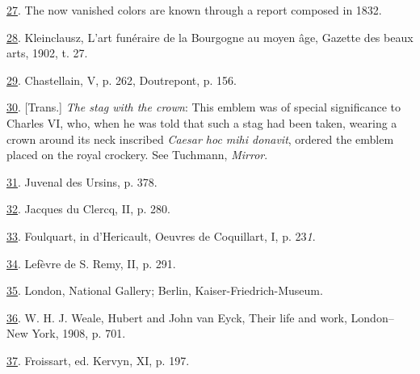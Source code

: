 \protect\hypertarget{23_NOTES.xhtmlux5cux23id_420}{\protect\hyperlink{20_ILLUSTRATIONS_FOLLOW_PAGE.xhtmlux5cux23id_419}{27}}.
The now vanished colors are known through a report composed in 1832.

\protect\hypertarget{23_NOTES.xhtmlux5cux23id_418}{\protect\hyperlink{20_ILLUSTRATIONS_FOLLOW_PAGE.xhtmlux5cux23id_417}{28}}.
Kleinclausz, L'art funéraire de la Bourgogne au moyen âge, Gazette des
beaux arts, 1902, t. 27.

\protect\hypertarget{23_NOTES.xhtmlux5cux23id_416}{\protect\hyperlink{20_ILLUSTRATIONS_FOLLOW_PAGE.xhtmlux5cux23id_415}{29}}.
Chastellain, V, p. 262, Doutrepont, p. 156.

\protect\hypertarget{23_NOTES.xhtmlux5cux23id_414}{\protect\hyperlink{20_ILLUSTRATIONS_FOLLOW_PAGE.xhtmlux5cux23id_413}{30}}.
{[}Trans.{]} \emph{The stag with the crown}: This emblem was of special
significance to Charles VI, who, when he was told that such a stag had
been taken, wearing
\protect\hypertarget{23_NOTES.xhtmlux5cux23page_433}{}{}a crown around
its neck inscribed \emph{Caesar hoc mihi donavit}, ordered the emblem
placed on the royal crockery. See Tuchmann, \emph{Mirror}.

\protect\hypertarget{23_NOTES.xhtmlux5cux23id_412}{\protect\hyperlink{20_ILLUSTRATIONS_FOLLOW_PAGE.xhtmlux5cux23id_411}{31}}.
Juvenal des Ursins, p. 378.

\protect\hypertarget{23_NOTES.xhtmlux5cux23id_410}{\protect\hyperlink{20_ILLUSTRATIONS_FOLLOW_PAGE.xhtmlux5cux23id_409}{32}}.
Jacques du Clercq, II, p. 280.

\protect\hypertarget{23_NOTES.xhtmlux5cux23id_408}{\protect\hyperlink{20_ILLUSTRATIONS_FOLLOW_PAGE.xhtmlux5cux23id_407}{33}}.
Foulquart, in d'Hericault, Oeuvres de Coquillart, I, p. 23\emph{1}.

\protect\hypertarget{23_NOTES.xhtmlux5cux23id_406}{\protect\hyperlink{20_ILLUSTRATIONS_FOLLOW_PAGE.xhtmlux5cux23id_405}{34}}.
Lefèvre de S. Remy, II, p. 291.

\protect\hypertarget{23_NOTES.xhtmlux5cux23id_404}{\protect\hyperlink{20_ILLUSTRATIONS_FOLLOW_PAGE.xhtmlux5cux23id_403}{35}}.
London, National Gallery; Berlin, Kaiser-Friedrich-Museum.

\protect\hypertarget{23_NOTES.xhtmlux5cux23id_402}{\protect\hyperlink{20_ILLUSTRATIONS_FOLLOW_PAGE.xhtmlux5cux23id_401}{36}}.
W. H. J. Weale, Hubert and John van Eyck, Their life and work,
London--New York, 1908, p. 701.

\protect\hypertarget{23_NOTES.xhtmlux5cux23id_400}{\protect\hyperlink{20_ILLUSTRATIONS_FOLLOW_PAGE.xhtmlux5cux23id_399}{37}}.
Froissart, ed. Kervyn, XI, p. 197.

